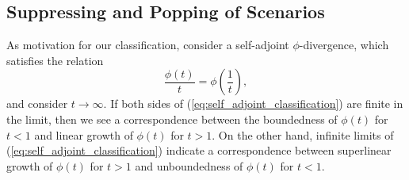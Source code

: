 \documentclass[12pt]{article}
\theoremstyle{plain}
\theoremstyle{definition}
\theoremstyle{remark}
\begin{document}
\subsection{Suppressing and Popping of Scenarios}
\label{ssec:suppressandpop}

As motivation for our classification, consider a self-adjoint $\phi$-divergence, which satisfies the relation
\begin{equation} \label{eq:self_adjoint_classification}
	\frac{\phi(t)}{t} = \phi\left(\frac{1}{t}\right),
\end{equation}
and consider $t \rightarrow \infty$.
If both sides of (\ref{eq:self_adjoint_classification}) are finite in the limit, then we see a correspondence between the boundedness of $\phi(t)$ for $t < 1$ and linear growth of $\phi(t)$ for $t > 1$.
On the other hand, infinite limits of (\ref{eq:self_adjoint_classification}) indicate a correspondence between superlinear growth of $\phi(t)$ for $t > 1$ and unboundedness of $\phi(t)$ for $t < 1$.
\end{document}
